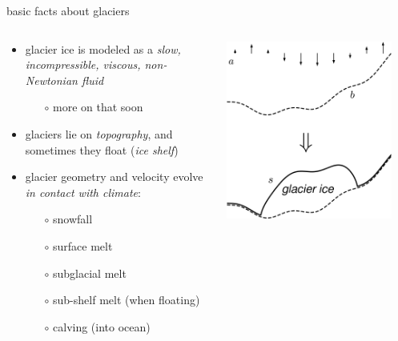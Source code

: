 \documentclass[svgnames,
               hyperref={colorlinks,citecolor=DeepPink4,linkcolor=FireBrick,urlcolor=Maroon},
               usepdftitle=false]  %
               {beamer}
\begin{document}
\begin{frame}{basic facts about glaciers}

\begin{columns}
\begin{column}{0.6\textwidth}
\begin{itemize}
\item glacier ice is modeled as a \emph{slow, incompressible, viscous, non-Newtonian fluid}
    \begin{itemize}
    \item[$\circ$] more on that soon
    \end{itemize}
\item glaciers lie on \emph{topography}, and sometimes they float  (\emph{ice shelf})
\item glacier geometry and velocity evolve \emph{in contact with climate}:
    \begin{itemize}
    \item[$\circ$] snowfall
    \item[$\circ$] surface melt
    \item[$\circ$] subglacial melt
    \item[$\circ$] sub-shelf melt (when floating)
    \item[$\circ$] calving (into ocean)
    \end{itemize}
\end{itemize}
\end{column}
\begin{column}{0.42\textwidth}
\hfill \includegraphics[width=0.9\textwidth]{images/map-glacier-ice.png}
\end{column}
\end{columns}
\end{frame}
\end{document}
